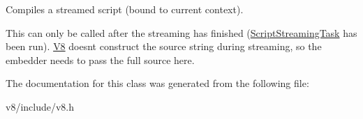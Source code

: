 Compiles a streamed script (bound to current context).

This can only be called after the streaming has finished (\hyperlink{classv8_1_1ScriptCompiler_1_1ScriptStreamingTask}{Script\+Streaming\+Task} has been run). \hyperlink{classv8_1_1V8}{V8} doesn\textquotesingle{}t construct the source string during streaming, so the embedder needs to pass the full source here. 

The documentation for this class was generated from the following file\+:\begin{DoxyCompactItemize}
\item 
v8/include/v8.\+h\end{DoxyCompactItemize}
